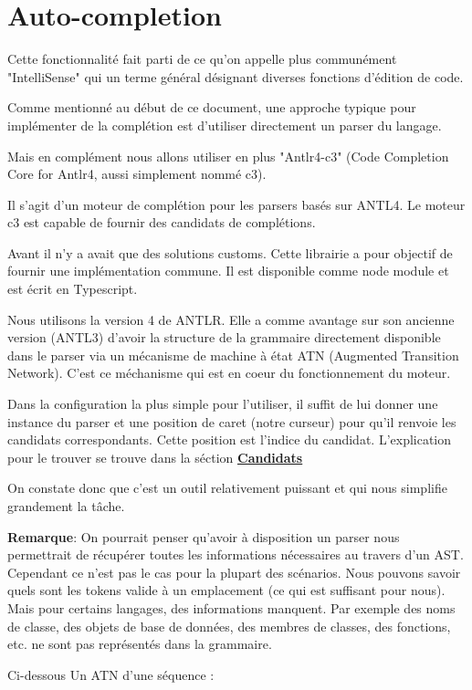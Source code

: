 \documentclass[
    iict, %
    il, %
]{heig-tb}
\begin{document}
\section{Auto-completion}
Cette fonctionnalité fait parti de ce qu'on appelle plus communément "IntelliSense" \cite{intelliSense} qui un terme général désignant diverses fonctions d'édition de code.

Comme mentionné au début de ce document, une approche typique pour implémenter de la complétion est d'utiliser directement un parser du langage.

Mais en complément nous allons utiliser en plus "Antlr4-c3" (Code Completion Core for Antlr4, aussi simplement nommé c3).

Il s'agit d'un moteur de complétion pour les parsers basés sur ANTL4. Le moteur c3 est capable de fournir des candidats de complétions.

Avant il n'y a avait que des solutions customs. Cette librairie a pour objectif de fournir une implémentation commune. Il est disponible comme node module et est écrit en Typescript.

Nous utilisons la version 4 de ANTLR. Elle a comme avantage sur son ancienne version (ANTL3) d'avoir la structure de la grammaire directement disponible dans le parser via
un mécanisme de machine à état ATN (Augmented Transition Network). C'est ce méchanisme qui est en coeur du fonctionnement du moteur.

Dans la configuration la plus simple pour l'utiliser, il suffit de lui donner une instance du parser et une position de caret (notre curseur) pour qu'il renvoie les candidats correspondants.
Cette position est l'indice du candidat. L'explication pour le trouver se trouve dans la séction \hyperref[candidates]{\textbf{Candidats}}

On constate donc que c'est un outil relativement puissant et qui nous simplifie grandement la tâche.

\textbf{Remarque}: On pourrait penser qu'avoir à disposition un parser nous permettrait de récupérer toutes les informations nécessaires au travers d'un AST. Cependant ce n'est pas le cas pour la plupart des scénarios.
Nous pouvons savoir quels sont les tokens valide à un emplacement (ce qui est suffisant pour nous). Mais pour certains langages, des informations manquent. Par exemple des noms de classe, des objets de base de données, des membres de classes, des fonctions, etc. ne sont pas représentés dans la grammaire. 

Ci-dessous Un ATN d'une séquence :
\end{document}
